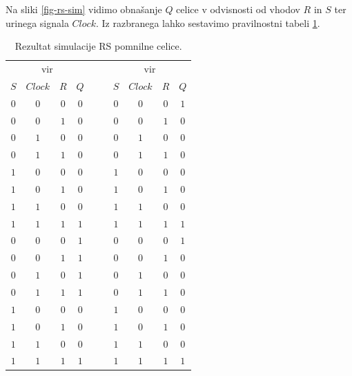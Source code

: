 \documentclass[a4paper, 11pt]{article}
\begin{document}
Na sliki \ref{fig-rs-sim} vidimo obnašanje $Q$ celice v odvisnosti od vhodov $R$ in $S$ ter urinega signala $Clock$. Iz razbranega lahko sestavimo pravilnostni tabeli \ref{tab-rs-sim}.
\begin{table}[h!]
	\centering
	\small
	\begin{tabular}{ccc|ccccc|c}
	\multicolumn{4}{c}{vir \cite{quantum_dot}} & $\quad$ & \multicolumn{4}{c}{vir \cite{a_novel_approach}}\\
	$S$ & $Clock$ & $R$ & $Q$ && $S$ & $Clock$ & $R$ & $Q$ \\
	\cline{1-4} \cline{6-9}
	$0$ & $0$ & $0$ & $0$ && $0$ & $0$ & $0$ & $1$\\
	$0$ & $0$ & $1$ & $0$ && $0$ & $0$ & $1$ & $0$\\
	$0$ & $1$ & $0$ & $0$ && $0$ & $1$ & $0$ & $0$\\
	$0$ & $1$ & $1$ & $0$ && $0$ & $1$ & $1$ & $0$\\
	$1$ & $0$ & $0$ & $0$ && $1$ & $0$ & $0$ & $0$\\
	$1$ & $0$ & $1$ & $0$ && $1$ & $0$ & $1$ & $0$\\
	$1$ & $1$ & $0$ & $0$ && $1$ & $1$ & $0$ & $0$\\
	$1$ & $1$ & $1$ & $1$ && $1$ & $1$ & $1$ & $1$\\
	\cline{1-4} \cline{6-9}
	$0$ & $0$ & $0$ & $1$ && $0$ & $0$ & $0$ & $1$\\
	$0$ & $0$ & $1$ & $1$ && $0$ & $0$ & $1$ & $0$\\
	$0$ & $1$ & $0$ & $1$ && $0$ & $1$ & $0$ & $0$\\
	$0$ & $1$ & $1$ & $1$ && $0$ & $1$ & $1$ & $0$\\
	$1$ & $0$ & $0$ & $0$ && $1$ & $0$ & $0$ & $0$\\
	$1$ & $0$ & $1$ & $0$ && $1$ & $0$ & $1$ & $0$\\
	$1$ & $1$ & $0$ & $0$ && $1$ & $1$ & $0$ & $0$\\
	$1$ & $1$ & $1$ & $1$ && $1$ & $1$ & $1$ & $1$\\
	\end{tabular}
	\caption{Rezultat simulacije RS pomnilne celice.}
	\label{tab-rs-sim}
\end{table}
\end{document}
